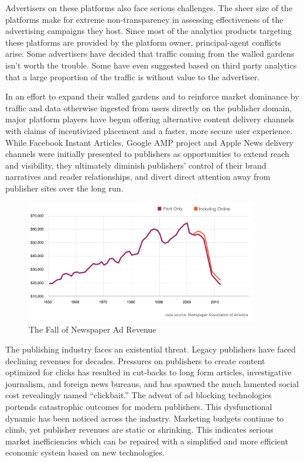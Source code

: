 \documentclass[11pt]{article}
\begin{document}
Advertisers on these platforms also face serious challenges. The sheer size of the platforms make for extreme non-transparency in assessing effectiveness of the advertising campaigns they host. Since most of the analytics products targeting these platforms are provided by the platform owner, principal-agent conflicts arise. Some advertisers have decided that traffic coming from the walled gardens isn’t worth the trouble. Some have even suggested based on third party analytics that a large proportion of the traffic is without value to the advertiser\cite{WithoutValue}.

In an effort to expand their walled gardens and to reinforce market dominance by traffic and data otherwise ingested from users directly on the publisher domain, major platform players have begun offering alternative content delivery channels with claims of incentivized placement and a faster, more secure user experience. While Facebook Instant Articles, Google AMP project and Apple News delivery channels were initially presented to publishers as opportunities to extend reach and visibility, they ultimately diminish publishers’ control of their brand narratives and reader relationships, and divert direct attention away from publisher sites over the long run.


\begin{figure}
\begin{center}
\includegraphics[width=0.9\textwidth]{newspaperadrev.png}
\caption{The Fall of Newspaper Ad Revenue}
\end{center}
\end{figure}


The publishing industry faces an existential threat. Legacy publishers have faced declining revenues for decades. Pressures on publishers to create content optimized for clicks has resulted in cut-backs to long form articles, investigative journalism, and foreign news bureaus, and has spawned the much lamented social cost revealingly named “clickbait.” The advent of ad blocking technologies portends catastrophic outcomes for modern publishers.
This dysfunctional dynamic has been noticed across the industry. Marketing budgets continue to climb\cite{Gartner1}, yet publisher revenues are static or shrinking\cite{Econsul}. This indicates serious market inefficiencies which can be repaired with a simplified and more efficient economic system based on new technologies.
\end{document}
